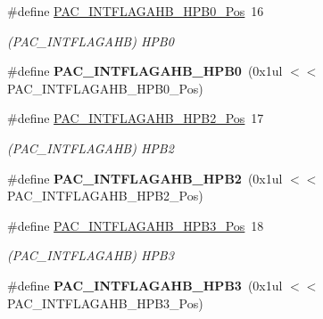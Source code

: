 \begin{DoxyCompactItemize}
\item 
\hypertarget{group___s_a_m_l21___p_a_c_ga9060cadbd6000995c8033e96d40c2ee3}{}\#define \hyperlink{group___s_a_m_l21___p_a_c_ga9060cadbd6000995c8033e96d40c2ee3}{P\+A\+C\+\_\+\+I\+N\+T\+F\+L\+A\+G\+A\+H\+B\+\_\+\+H\+P\+B0\+\_\+\+Pos}~16\label{group___s_a_m_l21___p_a_c_ga9060cadbd6000995c8033e96d40c2ee3}

\begin{DoxyCompactList}\small\item\em (P\+A\+C\+\_\+\+I\+N\+T\+F\+L\+A\+G\+A\+H\+B) H\+P\+B0 \end{DoxyCompactList}\item 
\hypertarget{group___s_a_m_l21___p_a_c_gaf5096db72e48e6f02314a7d0b3b3838b}{}\#define {\bfseries P\+A\+C\+\_\+\+I\+N\+T\+F\+L\+A\+G\+A\+H\+B\+\_\+\+H\+P\+B0}~(0x1ul $<$$<$ P\+A\+C\+\_\+\+I\+N\+T\+F\+L\+A\+G\+A\+H\+B\+\_\+\+H\+P\+B0\+\_\+\+Pos)\label{group___s_a_m_l21___p_a_c_gaf5096db72e48e6f02314a7d0b3b3838b}

\item 
\hypertarget{group___s_a_m_l21___p_a_c_ga8cb745f54251f1a82c17a32b53aea8a1}{}\#define \hyperlink{group___s_a_m_l21___p_a_c_ga8cb745f54251f1a82c17a32b53aea8a1}{P\+A\+C\+\_\+\+I\+N\+T\+F\+L\+A\+G\+A\+H\+B\+\_\+\+H\+P\+B2\+\_\+\+Pos}~17\label{group___s_a_m_l21___p_a_c_ga8cb745f54251f1a82c17a32b53aea8a1}

\begin{DoxyCompactList}\small\item\em (P\+A\+C\+\_\+\+I\+N\+T\+F\+L\+A\+G\+A\+H\+B) H\+P\+B2 \end{DoxyCompactList}\item 
\hypertarget{group___s_a_m_l21___p_a_c_gad021be78c00791d149f8373b440e3351}{}\#define {\bfseries P\+A\+C\+\_\+\+I\+N\+T\+F\+L\+A\+G\+A\+H\+B\+\_\+\+H\+P\+B2}~(0x1ul $<$$<$ P\+A\+C\+\_\+\+I\+N\+T\+F\+L\+A\+G\+A\+H\+B\+\_\+\+H\+P\+B2\+\_\+\+Pos)\label{group___s_a_m_l21___p_a_c_gad021be78c00791d149f8373b440e3351}

\item 
\hypertarget{group___s_a_m_l21___p_a_c_ga192895933b071d5cdb982db8da4a8d57}{}\#define \hyperlink{group___s_a_m_l21___p_a_c_ga192895933b071d5cdb982db8da4a8d57}{P\+A\+C\+\_\+\+I\+N\+T\+F\+L\+A\+G\+A\+H\+B\+\_\+\+H\+P\+B3\+\_\+\+Pos}~18\label{group___s_a_m_l21___p_a_c_ga192895933b071d5cdb982db8da4a8d57}

\begin{DoxyCompactList}\small\item\em (P\+A\+C\+\_\+\+I\+N\+T\+F\+L\+A\+G\+A\+H\+B) H\+P\+B3 \end{DoxyCompactList}\item 
\hypertarget{group___s_a_m_l21___p_a_c_gada4df2c1cbf6e3b2d6d17dba3e06f0ce}{}\#define {\bfseries P\+A\+C\+\_\+\+I\+N\+T\+F\+L\+A\+G\+A\+H\+B\+\_\+\+H\+P\+B3}~(0x1ul $<$$<$ P\+A\+C\+\_\+\+I\+N\+T\+F\+L\+A\+G\+A\+H\+B\+\_\+\+H\+P\+B3\+\_\+\+Pos)\label{group___s_a_m_l21___p_a_c_gada4df2c1cbf6e3b2d6d17dba3e06f0ce}


\end{DoxyCompactItemize}
